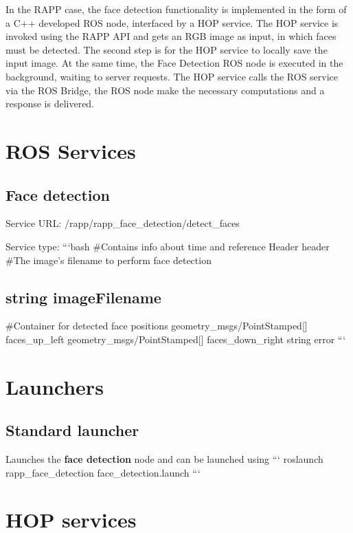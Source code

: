 In the R\-A\-P\-P case, the face detection functionality is implemented in the form of a C++ developed R\-O\-S node, interfaced by a H\-O\-P service. The H\-O\-P service is invoked using the R\-A\-P\-P A\-P\-I and gets an R\-G\-B image as input, in which faces must be detected. The second step is for the H\-O\-P service to locally save the input image. At the same time, the Face Detection R\-O\-S node is executed in the background, waiting to server requests. The H\-O\-P service calls the R\-O\-S service via the R\-O\-S Bridge, the R\-O\-S node make the necessary computations and a response is delivered.

\section*{R\-O\-S Services}

\subsection*{Face detection}

Service U\-R\-L\-: {\ttfamily /rapp/rapp\-\_\-face\-\_\-detection/detect\-\_\-faces}

Service type\-: ```bash \#\-Contains info about time and reference Header header \#\-The image's filename to perform face detection \subsection*{string image\-Filename }

\#\-Container for detected face positions geometry\-\_\-msgs/\-Point\-Stamped\mbox{[}\mbox{]} faces\-\_\-up\-\_\-left geometry\-\_\-msgs/\-Point\-Stamped\mbox{[}\mbox{]} faces\-\_\-down\-\_\-right string error ```

\section*{Launchers}

\subsection*{Standard launcher}

Launches the {\bfseries face detection} node and can be launched using ``` roslaunch rapp\-\_\-face\-\_\-detection face\-\_\-detection.\-launch ```

\section*{H\-O\-P services}


